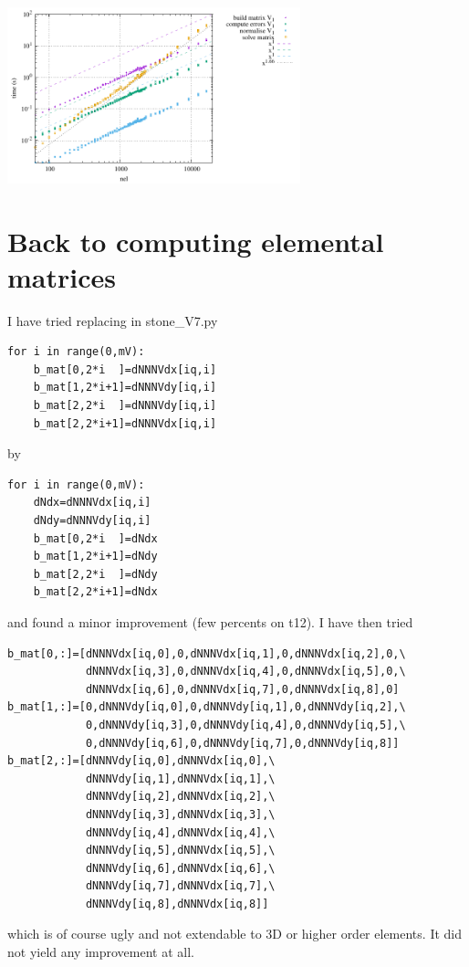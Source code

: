 \begin{center}
\includegraphics[width=8.5cm]{python_codes/fieldstone_150/results/times_V6}
\end{center}


\section*{Back to computing elemental matrices}

I have tried replacing in {\pythonfile stone\_V7.py} 
\begin{lstlisting}
for i in range(0,mV):
    b_mat[0,2*i  ]=dNNNVdx[iq,i]
    b_mat[1,2*i+1]=dNNNVdy[iq,i]
    b_mat[2,2*i  ]=dNNNVdy[iq,i]
    b_mat[2,2*i+1]=dNNNVdx[iq,i]
\end{lstlisting}
by 
\begin{lstlisting}
for i in range(0,mV):
    dNdx=dNNNVdx[iq,i] 
    dNdy=dNNNVdy[iq,i] 
    b_mat[0,2*i  ]=dNdx
    b_mat[1,2*i+1]=dNdy
    b_mat[2,2*i  ]=dNdy
    b_mat[2,2*i+1]=dNdx
\end{lstlisting}
and found a minor improvement (few percents on t12).
I have then tried 
\begin{lstlisting}
b_mat[0,:]=[dNNNVdx[iq,0],0,dNNNVdx[iq,1],0,dNNNVdx[iq,2],0,\
            dNNNVdx[iq,3],0,dNNNVdx[iq,4],0,dNNNVdx[iq,5],0,\
            dNNNVdx[iq,6],0,dNNNVdx[iq,7],0,dNNNVdx[iq,8],0]
b_mat[1,:]=[0,dNNNVdy[iq,0],0,dNNNVdy[iq,1],0,dNNNVdy[iq,2],\
            0,dNNNVdy[iq,3],0,dNNNVdy[iq,4],0,dNNNVdy[iq,5],\
            0,dNNNVdy[iq,6],0,dNNNVdy[iq,7],0,dNNNVdy[iq,8]]
b_mat[2,:]=[dNNNVdy[iq,0],dNNNVdx[iq,0],\
            dNNNVdy[iq,1],dNNNVdx[iq,1],\
            dNNNVdy[iq,2],dNNNVdx[iq,2],\
            dNNNVdy[iq,3],dNNNVdx[iq,3],\
            dNNNVdy[iq,4],dNNNVdx[iq,4],\
            dNNNVdy[iq,5],dNNNVdx[iq,5],\
            dNNNVdy[iq,6],dNNNVdx[iq,6],\
            dNNNVdy[iq,7],dNNNVdx[iq,7],\
            dNNNVdy[iq,8],dNNNVdx[iq,8]]
\end{lstlisting}
which is of course ugly and not extendable to 3D or higher order elements. 
It did not yield any improvement at all. 

